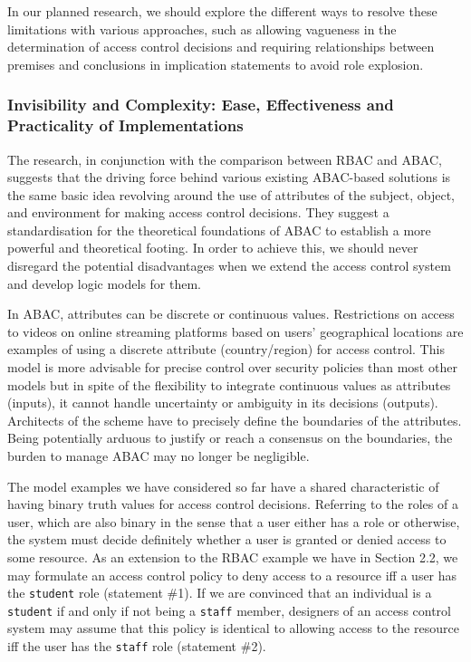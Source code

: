 \documentclass{article}
\begin{document}
In our planned research, we should explore the different ways to resolve these limitations with various approaches, such as allowing vagueness in the determination of access control decisions and requiring relationships between premises and conclusions in implication statements to avoid role explosion.

\subsubsection{Invisibility and Complexity: Ease, Effectiveness and Practicality of Implementations}

The research, in conjunction with the comparison between RBAC and ABAC, suggests that the driving force behind various existing ABAC-based solutions is the same basic idea revolving around the use of attributes of the subject, object, and environment for making access control decisions.\cite{rbac-vs-abac} They suggest a standardisation for the theoretical foundations of ABAC to establish a more powerful and theoretical footing. In order to achieve this, we should never disregard the potential disadvantages when we extend the access control system and develop logic models for them.

In ABAC, attributes can be discrete or continuous values.\cite{abac-logic} Restrictions on access to videos on online streaming platforms based on users' geographical locations are examples of using a discrete attribute (country/region) for access control. This model is more advisable for precise control over security policies than most other models but in spite of the flexibility to integrate continuous values as attributes (inputs), it cannot handle uncertainty or ambiguity in its decisions (outputs). Architects of the scheme have to precisely define the boundaries of the attributes. Being potentially arduous to justify or reach a consensus on the boundaries, the burden to manage ABAC may no longer be negligible.

The model examples we have considered so far have a shared characteristic of having binary truth values for access control decisions. Referring to the roles of a user, which are also binary in the sense that a user either has a role or otherwise, the system must decide definitely whether a user is granted or denied access to some resource. As an extension to the RBAC example we have in Section 2.2, we may formulate an access control policy to deny access to a resource iff a user has the \texttt{student} role (statement \#1). If we are convinced that an individual is a \texttt{student} if and only if not being a \texttt{staff} member, designers of an access control system may assume that this policy is identical to allowing access to the resource iff the user has the \texttt{staff} role (statement \#2).
\end{document}
